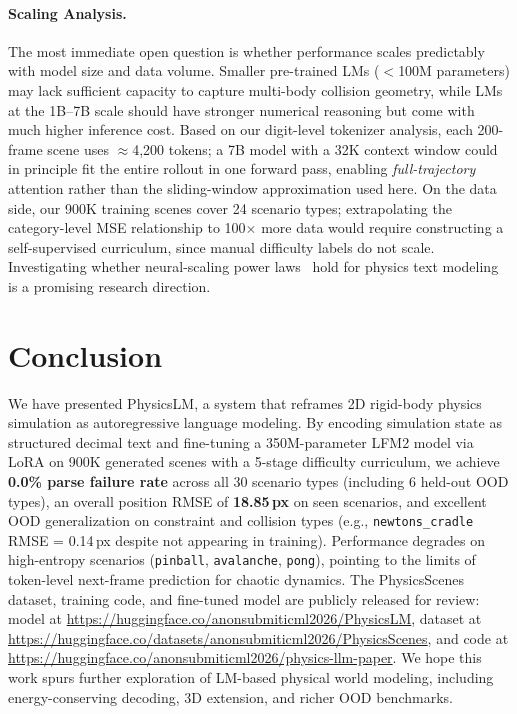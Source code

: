 \documentclass{article}
\begin{document}
\paragraph{Scaling Analysis.}
The most immediate open question is whether performance scales predictably with
model size and data volume. Smaller pre-trained LMs ($<$100M parameters) may lack
sufficient capacity to capture multi-body collision geometry, while LMs at the
1B--7B scale should have stronger numerical reasoning but come with much higher
inference cost. Based on our digit-level tokenizer analysis, each 200-frame scene
uses $\approx$4,200 tokens; a 7B model with a 32K context window could in principle
fit the entire rollout in one forward pass, enabling \emph{full-trajectory}
attention rather than the sliding-window approximation used here.
On the data side, our 900K training scenes cover 24 scenario types; extrapolating
the category-level MSE relationship to 100$\times$ more data would require
constructing a self-supervised curriculum, since manual difficulty labels do not
scale. Investigating whether neural-scaling power laws~\citep{kaplan2020scaling}
hold for physics text modeling is a promising research direction.

\section{Conclusion}
\label{sec:conclusion}

We have presented PhysicsLM, a system that reframes 2D rigid-body physics
simulation as autoregressive language modeling. By encoding simulation state as
structured decimal text and fine-tuning a 350M-parameter LFM2 model via LoRA on
900K generated scenes with a 5-stage difficulty curriculum, we achieve
\textbf{0.0\% parse failure rate} across all 30 scenario types (including 6
held-out OOD types), an overall position RMSE of \textbf{18.85\,px} on seen
scenarios, and excellent OOD generalization on constraint and collision types
(e.g., \texttt{newtons\_cradle} RMSE = 0.14\,px despite not appearing in
training). Performance degrades on high-entropy scenarios (\texttt{pinball},
\texttt{avalanche}, \texttt{pong}), pointing to the limits of token-level
next-frame prediction for chaotic dynamics. The PhysicsScenes dataset, training code, and fine-tuned model are publicly
released for review:
model at \url{https://huggingface.co/anonsubmiticml2026/PhysicsLM},
dataset at \url{https://huggingface.co/datasets/anonsubmiticml2026/PhysicsScenes},
and code at \url{https://huggingface.co/anonsubmiticml2026/physics-llm-paper}.
We hope this work spurs
further exploration of LM-based physical world modeling, including energy-conserving
decoding, 3D extension, and richer OOD benchmarks.
\end{document}
